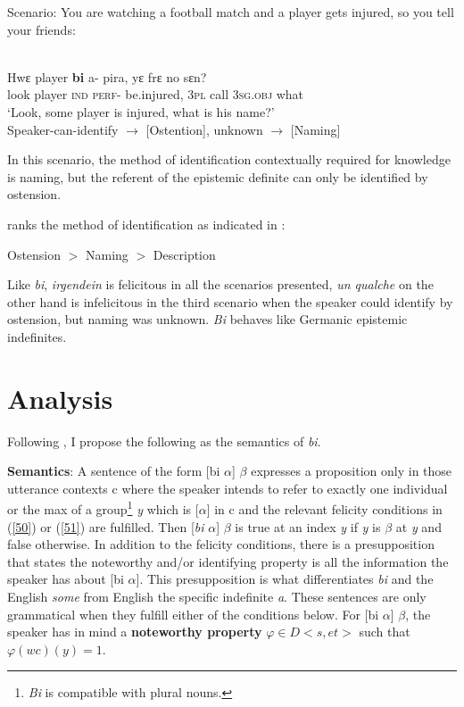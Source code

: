 \documentclass[output=paper,modfonts,nonflat,draftmode]{langsci/langscibook}
\begin{document}

 Scenario: You are watching a football match and a player gets injured, so you tell your friends:

 \ea\label{owusu:ex45c}\\
\gll Hwε player \textbf{bi} a- pira, yε frε no sεn?\\
look player  \textsc{ind} \textsc{perf}- be.injured, \textsc{3pl} call \textsc{3sg}.\textsc{obj} what\\
\glt `Look, some player is injured, what is his name?'\\
	Speaker-can-identify $\rightarrow$ [Ostention], unknown $\rightarrow$  [Naming]

 \z In this scenario, the method of identification contextually required for knowledge is naming, but the referent of the epistemic definite can only be identified by ostension.
 
 \citet{Aloni2001} ranks the method of identification as indicated in :
 
 \ea \label{ex:alonimethod} Ostension $>$ Naming $>$ Description \z
 
Like \emph{bi}, \emph{irgendein} is felicitous in all the scenarios presented, \emph{un qualche} on the other hand is infelicitous in the third scenario when the speaker could identify by ostension, but naming was unknown. \emph{Bi} behaves like Germanic epistemic indefinites.

\section{Analysis}\label{sec:owusu:4}
Following \citet{Ionin2013}, I propose the following as the semantics of \emph{bi}.

\textbf{Semantics}: A sentence of the form [bi $\alpha$] $\beta$ expresses a proposition only in those utterance contexts c where the speaker intends to refer to exactly one individual or the max of a group\footnote{\emph{Bi} is compatible with plural nouns.} \emph{y} which is [$\alpha$] in c and the relevant felicity conditions in (\ref{50}) or (\ref{51}) are fulfilled. Then [\emph{bi} $\alpha$] $\beta$ is true at an index \emph{y} if \emph{y} is $\beta$ at \emph{y} and false otherwise. In addition to the felicity conditions, there is a presupposition that states the noteworthy and/or identifying property is all the information the speaker has about [bi $\alpha$]. This presupposition is what differentiates \emph{bi} and the English \emph{some} from English the specific indefinite \emph{a}.   
These sentences are only grammatical when they fulfill either of the conditions below. 
\ea
\ea \label{50} For [bi $\alpha$] $\beta$, the speaker has in mind a \textbf{noteworthy property} $\varphi \in D<s,et>$ such that $\varphi (wc)(y) = 1$.
\end{document}
